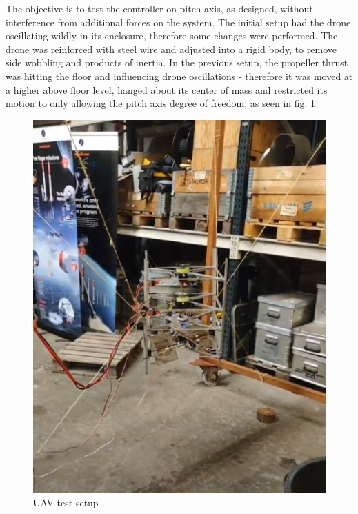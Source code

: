 The objective is to test the controller on pitch axis, as designed, without interference from additional forces on the system. The initial setup had the drone oscillating wildly in its enclosure, therefore some changes were performed. 
The drone was reinforced with steel wire and adjusted into a rigid body, to remove side wobbling and products of inertia. 
In the previous setup, the propeller thrust was hitting the floor and influencing drone oscillations - therefore it was moved at a higher above floor level, hanged about its  center of mass and  restricted its motion to only allowing the pitch axis degree of freedom, as seen in fig. \ref{fig:UAV test setup}

\begin{figure}[H]
    \centering
    \includegraphics[scale=0.7]{graphics/Control/DronePic.PNG}
    \caption{UAV test setup}
     \label{fig:UAV test setup}
\end{figure} 

